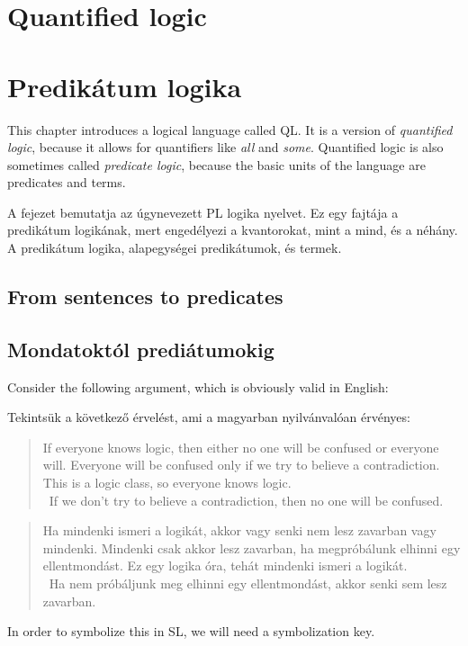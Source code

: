 
\chapter{Quantified logic}
\chapter{Predikátum logika}
\label{ch.QL}

This chapter introduces a logical language called QL. It is a version of \emph{quantified logic}, because it allows for quantifiers like \emph{all} and \emph{some}. Quantified logic is also sometimes called \emph{predicate logic}, because the basic units of the language are predicates and terms.

A fejezet bemutatja az úgynevezett PL logika nyelvet. Ez egy fajtája a predikátum logikának, mert engedélyezi a kvantorokat, mint a mind, és a néhány. A predikátum logika, alapegységei predikátumok, és termek.

\section{From sentences to predicates}
\section{Mondatoktól prediátumokig}
Consider the following argument, which is obviously valid in English:

Tekintsük a következő érvelést, ami a magyarban nyilvánvalóan érvényes:
\begin{quote}
If everyone knows logic, then either no one will be confused or everyone will. Everyone will be confused only if we try to believe a contradiction. This is a logic class, so everyone knows logic.\\
\therefore\ If we don't try to believe a contradiction, then no one will be confused.
\end{quote}
\begin{quote}
Ha mindenki ismeri a logikát, akkor vagy senki nem lesz zavarban vagy mindenki. Mindenki csak akkor lesz zavarban, ha megpróbálunk elhinni egy ellentmondást. Ez egy logika óra, tehát mindenki ismeri a logikát.\\
\therefore\ Ha nem próbáljunk meg elhinni egy ellentmondást, akkor senki sem lesz zavarban.
\end{quote}
In order to symbolize this in SL, we will need a symbolization key.

